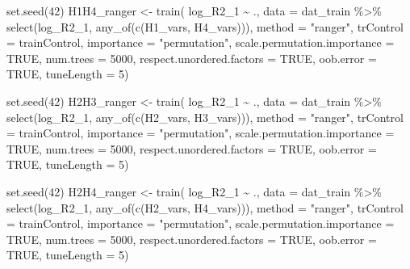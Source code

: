 \documentclass[
  letterpaper,
  DIV=11,
  numbers=noendperiod]{scrreprt}
\newenvironment{Shaded}{\begin{snugshade}}{\end{snugshade}}
\newcommand{\AttributeTok}[1]{\textcolor[rgb]{0.40,0.45,0.13}{#1}}
\newcommand{\ConstantTok}[1]{\textcolor[rgb]{0.56,0.35,0.01}{#1}}
\newcommand{\DecValTok}[1]{\textcolor[rgb]{0.68,0.00,0.00}{#1}}
\newcommand{\FunctionTok}[1]{\textcolor[rgb]{0.28,0.35,0.67}{#1}}
\newcommand{\NormalTok}[1]{\textcolor[rgb]{0.00,0.23,0.31}{#1}}
\newcommand{\OtherTok}[1]{\textcolor[rgb]{0.00,0.23,0.31}{#1}}
\newcommand{\SpecialCharTok}[1]{\textcolor[rgb]{0.37,0.37,0.37}{#1}}
\newcommand{\StringTok}[1]{\textcolor[rgb]{0.13,0.47,0.30}{#1}}
\begin{document}
\begin{Shaded}
\begin{Highlighting}[]
\FunctionTok{set.seed}\NormalTok{(}\DecValTok{42}\NormalTok{)}
\NormalTok{H1H4\_ranger }\OtherTok{\textless{}{-}} \FunctionTok{train}\NormalTok{(}
\NormalTok{    log\_R2\_1 }\SpecialCharTok{\textasciitilde{}}\NormalTok{ .,}
    \AttributeTok{data =}\NormalTok{ dat\_train }\SpecialCharTok{\%\textgreater{}\%} \FunctionTok{select}\NormalTok{(log\_R2\_1, }\FunctionTok{any\_of}\NormalTok{(}\FunctionTok{c}\NormalTok{(H1\_vars, H4\_vars))),}
    \AttributeTok{method =} \StringTok{"ranger"}\NormalTok{,}
    \AttributeTok{trControl =}\NormalTok{ trainControl,}
    \AttributeTok{importance =} \StringTok{"permutation"}\NormalTok{,}
    \AttributeTok{scale.permutation.importance =} \ConstantTok{TRUE}\NormalTok{,}
    \AttributeTok{num.trees =} \DecValTok{5000}\NormalTok{,}
    \AttributeTok{respect.unordered.factors =} \ConstantTok{TRUE}\NormalTok{,}
    \AttributeTok{oob.error =} \ConstantTok{TRUE}\NormalTok{,}
    \AttributeTok{tuneLength =} \DecValTok{5}\NormalTok{)}


\FunctionTok{set.seed}\NormalTok{(}\DecValTok{42}\NormalTok{)}
\NormalTok{H2H3\_ranger }\OtherTok{\textless{}{-}} \FunctionTok{train}\NormalTok{(}
\NormalTok{    log\_R2\_1 }\SpecialCharTok{\textasciitilde{}}\NormalTok{ .,}
    \AttributeTok{data =}\NormalTok{ dat\_train }\SpecialCharTok{\%\textgreater{}\%} \FunctionTok{select}\NormalTok{(log\_R2\_1, }\FunctionTok{any\_of}\NormalTok{(}\FunctionTok{c}\NormalTok{(H2\_vars, H3\_vars))),}
    \AttributeTok{method =} \StringTok{"ranger"}\NormalTok{,}
    \AttributeTok{trControl =}\NormalTok{ trainControl,}
    \AttributeTok{importance =} \StringTok{"permutation"}\NormalTok{,}
    \AttributeTok{scale.permutation.importance =} \ConstantTok{TRUE}\NormalTok{,}
    \AttributeTok{num.trees =} \DecValTok{5000}\NormalTok{,}
    \AttributeTok{respect.unordered.factors =} \ConstantTok{TRUE}\NormalTok{,}
    \AttributeTok{oob.error =} \ConstantTok{TRUE}\NormalTok{,}
    \AttributeTok{tuneLength =} \DecValTok{5}\NormalTok{)}


\FunctionTok{set.seed}\NormalTok{(}\DecValTok{42}\NormalTok{)}
\NormalTok{H2H4\_ranger }\OtherTok{\textless{}{-}} \FunctionTok{train}\NormalTok{(}
\NormalTok{    log\_R2\_1 }\SpecialCharTok{\textasciitilde{}}\NormalTok{ .,}
    \AttributeTok{data =}\NormalTok{ dat\_train }\SpecialCharTok{\%\textgreater{}\%} \FunctionTok{select}\NormalTok{(log\_R2\_1, }\FunctionTok{any\_of}\NormalTok{(}\FunctionTok{c}\NormalTok{(H2\_vars, H4\_vars))),}
    \AttributeTok{method =} \StringTok{"ranger"}\NormalTok{,}
    \AttributeTok{trControl =}\NormalTok{ trainControl,}
    \AttributeTok{importance =} \StringTok{"permutation"}\NormalTok{,}
    \AttributeTok{scale.permutation.importance =} \ConstantTok{TRUE}\NormalTok{,}
    \AttributeTok{num.trees =} \DecValTok{5000}\NormalTok{,}
    \AttributeTok{respect.unordered.factors =} \ConstantTok{TRUE}\NormalTok{,}
    \AttributeTok{oob.error =} \ConstantTok{TRUE}\NormalTok{,}
    \AttributeTok{tuneLength =} \DecValTok{5}\NormalTok{)}


\end{Highlighting}
\end{Shaded}
\end{document}
